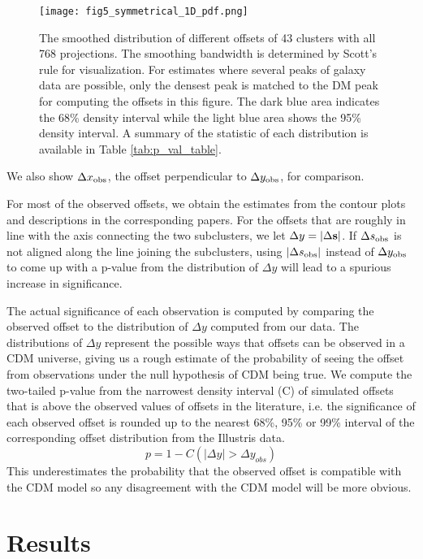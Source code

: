 \begin{figure*}
	\centering
	\texttt{[image: fig5\_symmetrical\_1D\_pdf.png]}
	\caption{The smoothed distribution of different offsets of 43 clusters with all 768
		projections. The smoothing bandwidth is determined by Scott's rule
		\citep{Scott2010} for 
	visualization.
	For estimates where several peaks of galaxy data are 
	possible, only the densest peak is matched to the DM peak for computing
	the offsets in this figure. 
	The dark blue area indicates the 68\% density interval
	while the light blue area shows the 95\% density interval. 
	A summary of the statistic of each distribution is available in
	Table \ref{tab:p_val_table}. 
		\label{fig:offset_distributions}}
\end{figure*}
We also show $\Delta x_{\rm obs}$, the offset perpendicular to
$\Delta y_{\rm obs}$, for comparison.

For most of the observed offsets, we obtain the estimates from the contour plots 
and descriptions in the corresponding papers. 
For the offsets that are roughly in line with the axis connecting the two subclusters,
we let $\Delta y = |\Delta {\bf s}|$. 
If $\Delta s_{\rm obs}$ is not aligned along the line joining the subclusters,
using $|\Delta s_{\rm obs}|$ instead of $\Delta y_{\rm obs}$ to come 
up with a p-value from the distribution of 
$\Delta y$ will lead to a spurious increase in significance.

The actual significance of each observation is computed by comparing the
observed offset to the distribution of $\Delta y$ computed from our data. 
The distributions of $\Delta y$ represent the possible ways that offsets can be observed in a CDM
universe, giving us a rough estimate of the probability 
of seeing the offset from observations under the null hypothesis of CDM 
being true. 
We compute the two-tailed 
p-value from the narrowest density interval (C) of simulated offsets 
that is above the observed values of offsets in the literature, 
i.e. the significance of each observed offset is rounded up to the nearest 68\%, 95\% or 99\%
interval of the corresponding offset distribution from the Illustris data. 
\begin{equation}
	p = 1 - C(|\Delta y| > \Delta y_{obs})
\end{equation}
This underestimates the probability that the
observed offset is compatible with the CDM model so
any disagreement with the CDM model will be more obvious. 

 
\section{Results} 
\label{sec:results}

